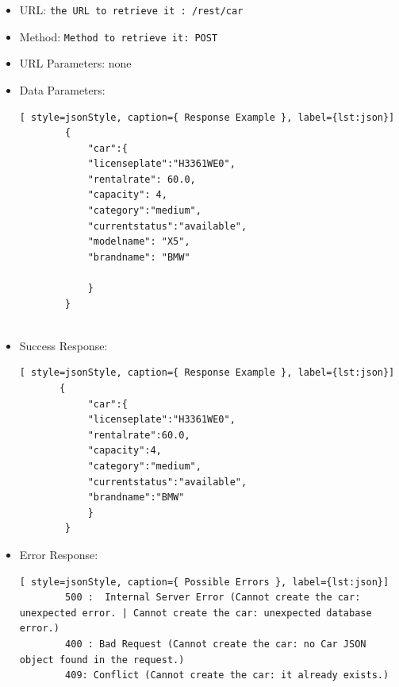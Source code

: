 \begin{itemize}
    \item URL: \texttt{the URL to retrieve it : /rest/car}
    \item Method: \texttt{Method to retrieve it: POST}
    \item URL Parameters: none
    \item Data Parameters: 
      \begin{lstlisting}[ style=jsonStyle, caption={ Response Example }, label={lst:json}]
        {
            "car":{
            "licenseplate":"H3361WE0",
            "rentalrate": 60.0,
            "capacity": 4,
            "category":"medium",
            "currentstatus":"available",
            "modelname": "X5",
            "brandname": "BMW"
        
            }
        }
        
        \end{lstlisting}
    \item Success Response: 
        \begin{lstlisting}[ style=jsonStyle, caption={ Response Example }, label={lst:json}]
       {
            "car":{
            "licenseplate":"H3361WE0",
            "rentalrate":60.0,
            "capacity":4,
            "category":"medium",
            "currentstatus":"available",
            "brandname":"BMW"
            }
        }
        \end{lstlisting}
    \item Error Response: 
        \begin{lstlisting}[ style=jsonStyle, caption={ Possible Errors }, label={lst:json}]
        500 :  Internal Server Error (Cannot create the car: unexpected error. | Cannot create the car: unexpected database error.)
        400 : Bad Request (Cannot create the car: no Car JSON object found in the request.)
        409: Conflict (Cannot create the car: it already exists.)
        \end{lstlisting}
\newpage
    
\end{itemize}

